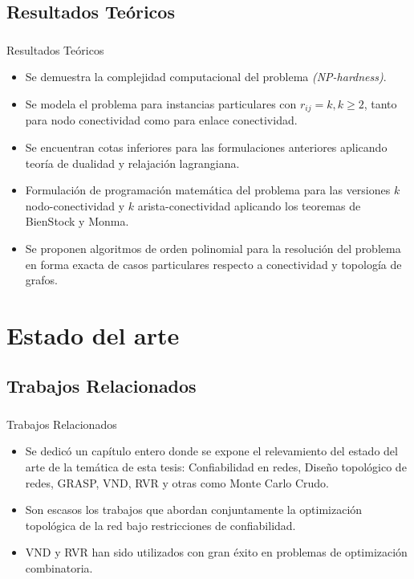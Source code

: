 \subsection{Resultados Teóricos}
\begin{frame}
	\frametitle{}
    \begin{block}{Resultados Teóricos}
    \begin{small}
		\begin{itemize} 
    		\item Se demuestra la complejidad computacional del problema \emph{(NP-hardness)}.
			\item Se modela el problema para instancias particulares con $r_{ij} = k, k \geq 2$, tanto para nodo conectividad como para enlace conectividad.
			\item Se encuentran cotas inferiores para las formulaciones anteriores aplicando teoría de dualidad y relajación lagrangiana.
	    	\item Formulación de programación matemática del problema para las versiones $k$ nodo-conectividad y $k$ arista-conectividad aplicando los teoremas de BienStock y Monma.
    		\item Se proponen algoritmos de orden polinomial para la resolución del problema en forma exacta de casos particulares respecto a conectividad y topología de grafos.
    	\end{itemize} 
    			\end{small}
    \end{block}
\end{frame}

\section{Estado del arte}
\subsection{Trabajos Relacionados}
\begin{frame}\frametitle{}
\begin{block}{Trabajos Relacionados}
	\begin{itemize} 
    	\item Se dedicó un capítulo entero donde se expone el relevamiento del estado del arte de la temática de esta tesis: Confiabilidad en redes, Diseño topológico de redes, GRASP, VND, RVR y otras como Monte Carlo Crudo.
    	\item Son escasos los trabajos que abordan conjuntamente la optimización topológica de la red  bajo restricciones de confiabilidad.
    	\item VND y RVR han sido utilizados con gran éxito en problemas de optimización combinatoria.
    \end{itemize} 
\end{block}
\end{frame}

